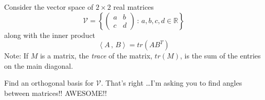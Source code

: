 \begin{problem}
    Consider the vector space of $2 \times 2$ real matrices 
    \[ \mathcal{V} = \left\{ \begin{pmatrix} a & b \\ c & d \end{pmatrix} \, : \,
    a,b,c,d \in \mathbb{R} \right\} \]
    along with the inner product
    \[ \left< A \, , \, B \right> = tr(AB^T) \]
    Note: If $M$ is a matrix, the {\it trace} of the matrix, $tr(M)$, is the sum
    of the entries on the main diagonal.
    
Find an orthogonal basis for $\mathcal{V}$.  That's right \dots I'm asking you to find
angles between matrices!! AWESOME!!
\end{problem}
\solution{
    \[ \begin{pmatrix} 1 & 0 \\ 0 & 0 \end{pmatrix}, 
        \begin{pmatrix} 0 & 1 \\ 0 & 0 \end{pmatrix},
        \begin{pmatrix} 0 & 0 \\ 1 & 0 \end{pmatrix},
    \begin{pmatrix} 0 & 0 \\ 0 & 1 \end{pmatrix} \]
}





